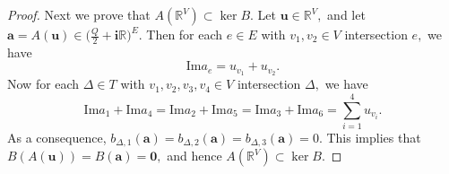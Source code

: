 \documentclass[11pt]{article}
\theoremstyle{remark}
\theoremstyle{remark}
\numberwithin{equation}{section}
\begin{document}
\begin{proof}
Next we prove that $A(\mathbb R^V)\subset \ker B.$ Let $\boldsymbol u\in \mathbb R^V,$ and let $\boldsymbol a=A(\boldsymbol u)\in \big(\frac{Q}{2}+\mathbf i\mathbb R\big)^E.$ Then for each $e\in E$ with $v_1,v_2\in V$ intersection $e,$ we have 
$$\mathrm{Im}a_e= u_{v_1}+u_{v_2}.$$
Now for each $\Delta\in T$ with  $v_1,v_2,v_3, v_4\in V$ intersection $\Delta,$  we have 
$$\mathrm{Im}a_1+\mathrm{Im}a_4=\mathrm{Im}a_2+\mathrm{Im}a_5=\mathrm{Im}a_3+\mathrm{Im}a_6=\sum_{i=1}^4u_{v_i}.$$
As a consequence, $b_{\Delta,1}(\boldsymbol a)=b_{\Delta,2}(\boldsymbol a)=b_{\Delta,3}(\boldsymbol a)=0.$ This implies that 
$B(A(\boldsymbol u))=B(\boldsymbol a)=\boldsymbol 0,$ and hence $A(\mathbb R^V)\subset \ker B.$ 
\end{proof}
\end{document}
